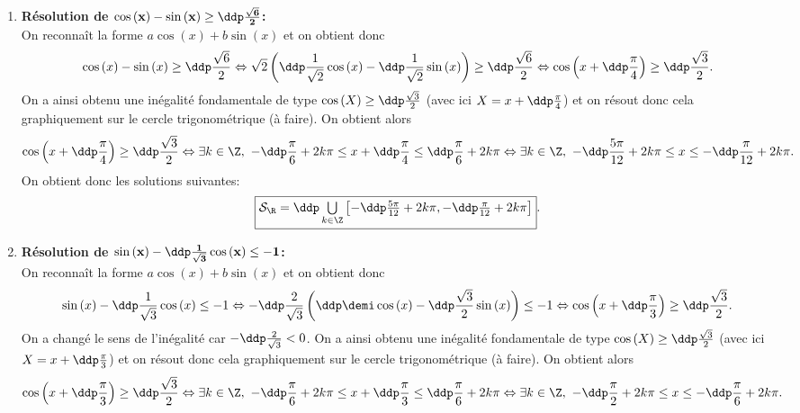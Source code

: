 \begin{correction}
\begin{enumerate}
La r\'esolution sur le cercle trigonom\'etrique (\`a faire) donne 
$$\fbox{$\mathcal{S}= \ddp \mathop{\bigcup}\limits_{k\in \Z} \left[ -\ddp\frac{5\pi}{6}+2k\pi, -\ddp\frac{3\pi}{4}+2k\pi \right] \cup \left[ -\ddp\frac{\pi}{4}+2k\pi, -\ddp\frac{\pi}{6}+2k\pi \right] \cup \left[ \ddp\frac{\pi}{6}+2k\pi,  \ddp\frac{\pi}{4}+2k\pi \right] \cup\left[ \ddp\frac{3\pi}{4}+2k\pi, \ddp\frac{5\pi}{6}+2k\pi\right]$}.$$
\item \textbf{R\'esolution de $\mathbf{\cos{(x)}-\sin{(x)}\geq \ddp\frac{\sqrt{6}}{2}   }$:}\\
\noindent On reconna\^{i}t la forme $a\cos{(x)}+b\sin{(x)}$ et on obtient donc
$$\cos{(x)}-\sin{(x)}\geq \ddp\frac{\sqrt{6}}{2} \Leftrightarrow \sqrt{2}\left( \ddp\frac{1}{\sqrt{2}} \cos{(x)}-\ddp\frac{1}{\sqrt{2}}\sin{(x)}  \right)\geq \ddp\frac{\sqrt{6}}{2}\Leftrightarrow \cos{\left(x  +\ddp\frac{\pi}{4} \right)}\geq \ddp\frac{\sqrt{3}}{2}.$$
On a ainsi obtenu une in\'egalit\'e fondamentale de type $\cos{(X)}\geq \ddp\frac{\sqrt{3}}{2}$ (avec ici $X=x+\ddp\frac{\pi}{4}$) et on r\'esout donc cela graphiquement sur le cercle trigonom\'etrique (\`a faire). On obtient alors
$$\cos{\left(x  +\ddp\frac{\pi}{4} \right)}\geq \ddp\frac{\sqrt{3}}{2} \Leftrightarrow \exists k\in\Z,\ -\ddp\frac{\pi}{6}+2k\pi\leq x+\ddp\frac{\pi}{4}\leq \ddp\frac{\pi}{6}+2k\pi\Leftrightarrow  \exists k\in\Z,\ -\ddp\frac{5\pi}{12}+2k\pi\leq x\leq -\ddp\frac{\pi}{12}+2k\pi.$$
On obtient donc les solutions suivantes:
$$\fbox{$\mathcal{S}_{\R}= \ddp \mathop{\bigcup}\limits_{k\in \Z} \left[  -\ddp\frac{5\pi}{12}+2k\pi, -\ddp\frac{\pi}{12}+2k\pi \right]$}.$$
\item \textbf{R\'esolution de $\mathbf{\sin{(x)}-\ddp\frac{1}{\sqrt{3}}\cos{(x)}\leq -1}$:}\\
\noindent On reconna\^{i}t la forme $a\cos{(x)}+b\sin{(x)}$ et on obtient donc
$$\sin{(x)}-\ddp\frac{1}{\sqrt{3}}\cos{(x)}\leq -1 \Leftrightarrow -\ddp\frac{2}{\sqrt{3}}\left( \ddp\demi \cos{(x)}-\ddp\frac{\sqrt{3}}{2}\sin{(x)}  \right)\leq -1\Leftrightarrow \cos{\left(x  +\ddp\frac{\pi}{3} \right)}\geq \ddp\frac{\sqrt{3}}{2}.$$
On a chang\'e le sens de l'in\'egalit\'e car $-\ddp\frac{2}{\sqrt{3}}<0$. On a ainsi obtenu une in\'egalit\'e fondamentale de type $\cos{(X)}\geq \ddp\frac{\sqrt{3}}{2}$ (avec ici $X=x+\ddp\frac{\pi}{3}$) et on r\'esout donc cela graphiquement sur le cercle trigonom\'etrique (\`a faire). On obtient alors
$$\cos{\left(x  +\ddp\frac{\pi}{3} \right)}\geq \ddp\frac{\sqrt{3}}{2} \Leftrightarrow \exists k\in\Z,\ -\ddp\frac{\pi}{6}+2k\pi\leq x+\ddp\frac{\pi}{3}\leq \ddp\frac{\pi}{6}+2k\pi\Leftrightarrow  \exists k\in\Z,\ -\ddp\frac{\pi}{2}+2k\pi\leq x\leq -\ddp\frac{\pi}{6}+2k\pi.$$

\end{enumerate}
\end{correction}

